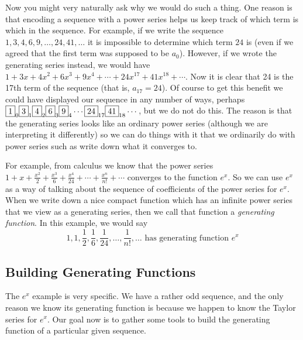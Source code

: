 \documentclass[12pt]{article}
\begin{document}
Now you might very naturally ask why we would do such a thing.  One reason is that encoding a sequence with a power series helps us keep track of which term is which in the sequence.  For example, if we write the sequence $1, 3, 4, 6, 9, \ldots, 24, 41,\ldots$ it is impossible to determine which term $24$ is (even if we agreed that the first term was supposed to be $a_0$).  However, if we wrote the generating series instead, we would have $1 + 3x + 4x^2 + 6x^3 + 9x^4 + \cdots + 24 x^{17} + 41 x^{18} + \cdots$.  Now it is clear that 24 is the 17th term of the sequence (that is, $a_{17} = 24$).  Of course to get this benefit we could have displayed our sequence in any number of ways, perhaps $\fbox{1}_0 \fbox{3}_1 \fbox{4}_2 \fbox{6}_3 \fbox{9}_4 \cdots \fbox{24}_{17}\fbox{41}_{18}\cdots$, but we do not do this. The reason is that the generating series looks like an ordinary power series (although we are interpreting it differently) so we can do things with it that we ordinarily do with power series such as write down what it converges to.

For example, from calculus we know that the power series $1 + x + \frac{x^2}{2} + \frac{x^3}{6} + \frac{x^4}{24} + \cdots + \frac{x^n}{n!} + \cdots$ converges to the function $e^x$.  So we can use $e^x$ as a way of talking about the sequence of coefficients of the power series for $e^x$.  When we write down a nice compact function which has an infinite power series that we view as a generating series, then we call that function a {\em generating function}.  In this example, we would say
\[1, 1, \frac{1}{2}, \frac{1}{6}, \frac{1}{24}, \ldots, \frac{1}{n!}, \ldots \mbox{ has generating function } e^x\]

\subsection{Building Generating Functions}

The $e^x$ example is very specific.  We have a rather odd sequence, and the only reason we know its generating function is because we happen to know the Taylor series for $e^x$.  Our goal now is to gather some tools to build the generating function of a particular given sequence.
\end{document}
